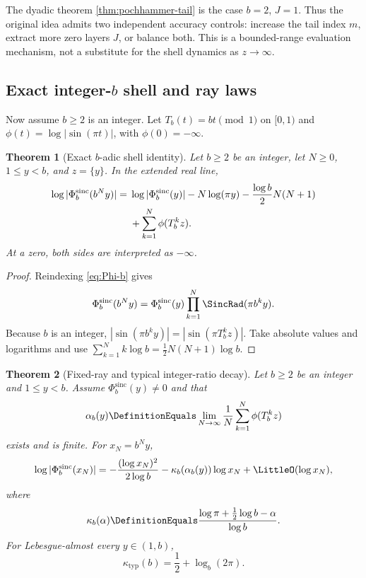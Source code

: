 \documentclass[11pt,oneside]{article}
\numberwithin{equation}{section}
\newtheorem{theorem}{Theorem}[section]
\theoremstyle{definition}
\theoremstyle{remark}
\newcommand{\GeometricSincProduct}[1]{\Phi^{\mathrm{sinc}}_{#1}}
\begin{document}
The dyadic theorem \ref{thm:pochhammer-tail} is the case $b=2$, $J=1$.  Thus the original
idea admits two independent accuracy controls: increase the tail index $m$, extract more
zero layers $J$, or balance both.  This is a bounded-range evaluation mechanism, not a
substitute for the shell dynamics as $z\to\infty$.

\subsection{Exact integer-\texorpdfstring{$b$}{b} shell and ray laws}

Now assume $b\ge2$ is an integer.  Let
$T_b(t)=bt\pmod1$ on $[0,1)$ and
$\phi(t)=\log|\sin(\pi t)|$, with $\phi(0)=-\infty$.

\begin{theorem}[Exact $b$-adic shell identity]
\label{thm:b-adic-shell}
Let $b\ge2$ be an integer, let $N\ge0$, $1\le y<b$, and $z=\{y\}$.  In the extended
real line,
\begin{align}
 \log|\GeometricSincProduct{b}(b^Ny)|
 ={}&\log|\GeometricSincProduct{b}(y)|-N\log(\pi y)
 -\frac{\log b}{2}N(N+1) \notag\\
 &+\sum_{k=1}^{N}\phi(T_b^kz).
 \label{eq:b-adic-shell}
\end{align}
At a zero, both sides are interpreted as $-\infty$.
\end{theorem}

\begin{proof}
Reindexing \eqref{eq:Phi-b} gives
\[
 \GeometricSincProduct{b}(b^Ny)=\GeometricSincProduct{b}(y)\prod_{k=1}^{N}\SincRad(\pi b^ky).
\]
Because $b$ is an integer,
$|\sin(\pi b^ky)|=|\sin(\pi T_b^kz)|$.  Take absolute values and logarithms and use
$\sum_{k=1}^{N}k\log b=\tfrac12N(N+1)\log b$.
\end{proof}

\begin{theorem}[Fixed-ray and typical integer-ratio decay]
\label{thm:b-adic-ray}
Let $b\ge2$ be an integer and $1\le y<b$.  Assume $\GeometricSincProduct{b}(y)\ne0$ and that
\[
 \alpha_b(y)\DefinitionEquals\lim_{N\to\infty}\frac1N
 \sum_{k=1}^{N}\phi(T_b^kz)
\]
exists and is finite.  For $x_N=b^Ny$,
\begin{equation}
 \log|\GeometricSincProduct{b}(x_N)|
 =-\frac{(\log x_N)^2}{2\log b}
  -\kappa_b(\alpha_b(y))\log x_N+\LittleO(\log x_N),
 \label{eq:b-adic-ray}
\end{equation}
where
\begin{equation}
 \kappa_b(\alpha)
 \DefinitionEquals\frac{\log\pi+\tfrac12\log b-\alpha}{\log b}.
 \label{eq:kappa-b-alpha}
\end{equation}
For Lebesgue-almost every $y\in(1,b)$,
\begin{equation}
 \boxed{\displaystyle
 \kappa_{\mathrm{typ}}(b)
 =\frac12+\log_b(2\pi).}
 \label{eq:kappa-b-typical}
\end{equation}
\end{theorem}
\end{document}

